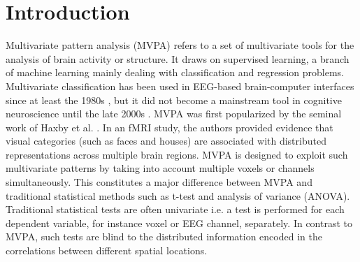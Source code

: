 \documentclass[utf8]{frontiersSCNS} %
\begin{document}
\section{Introduction}

Multivariate pattern analysis (MVPA) refers to a set of multivariate tools for the analysis of brain activity or structure. It draws on supervised learning, a branch of machine learning mainly dealing with classification and regression problems. Multivariate classification has been used in EEG-based brain-computer interfaces since at least the 1980s \citep{Farwell}, but it did not become a mainstream tool in cognitive neuroscience until the late 2000s \citep{Blankertz2011,Lemm2011,Mur2009,Pereira2009}. MVPA was first popularized by the seminal work of Haxby et al. \citep{Haxby2001,Haxby2012,Norman2006}. In an fMRI study, the authors provided evidence that visual categories (such as faces and houses) are associated with distributed representations across multiple brain regions. MVPA is designed to exploit such multivariate patterns by taking into account multiple voxels or channels simultaneously. This constitutes a major difference between MVPA and traditional statistical methods such as t-test and analysis of variance (ANOVA). Traditional statistical tests are often univariate i.e. a test is performed for each dependent variable, for instance voxel or EEG channel, separately. In contrast to MVPA, such tests are blind to the distributed information encoded in the correlations between different spatial locations.
\end{document}
